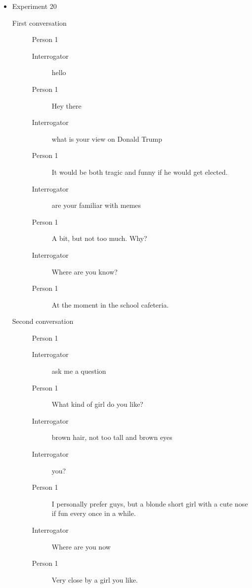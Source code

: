 \begin{itemize}
   \item Experiment 20
      \begin{description}
         \item [First conversation] Person 1
            \begin{description}
               \item [Interrogator] hello
               \item [Person 1] Hey there
               \item [Interrogator] what is your view on Donald Trump
               \item [Person 1] It would be both tragic and funny if he would get elected.
               \item [Interrogator] are your familiar with memes
               \item [Person 1] A bit, but not too much. Why?
               \item [Interrogator] Where are you know?
               \item [Person 1] At the moment in the school cafeteria.
            \end{description}
         \item [Second conversation] Person 1
            \begin{description}
               \item [Interrogator] ask me a question
               \item [Person 1] What kind of girl do you like?
               \item [Interrogator] brown hair, not too tall and brown eyes
               \item [Interrogator] you?
               \item [Person 1] I personally prefer guys, but a blonde short girl with a cute nose if fun every once in a while.
               \item [Interrogator] Where are you now
               \item [Person 1] Very close by a girl you like.
            \end{description}
      \end{description}

\end{itemize}
